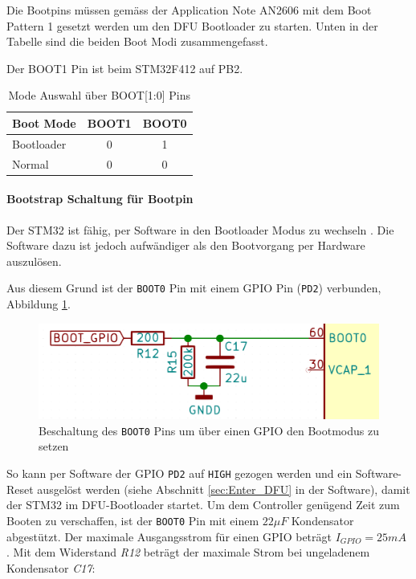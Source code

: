 Die Bootpins müssen gemäss der Application Note AN2606 \cite[Table 2]{AN2606} mit dem Boot Pattern 1 gesetzt werden um den DFU Bootloader zu starten.
Unten in der Tabelle sind die beiden Boot Modi zusammengefasst.

Der BOOT1 Pin ist beim STM32F412 auf PB2.

\begin{table}[H]
\centering
\begin{tabular}{|l|c|c|}
\hline
\textbf{Boot Mode} & \textbf{BOOT1} & \textbf{BOOT0} \\ \hline
Bootloader         & 0              & 1              \\ \hline
Normal             & 0              & 0              \\ \hline
\end{tabular}
\caption{Mode Auswahl über BOOT[1:0] Pins}
\end{table}

\paragraph{Bootstrap Schaltung für Bootpin}

Der STM32 ist fähig, per Software in den Bootloader Modus zu wechseln \cite{STM32-Softreset-Stackoverflow}. Die Software dazu ist jedoch aufwändiger als den Bootvorgang per Hardware auszulösen.

Aus diesem Grund ist der \texttt{BOOT0} Pin mit einem GPIO Pin (\texttt{PD2}) verbunden, Abbildung \ref{fig:Schema_Bootpin_Bootstrap}.

\begin{figure} [H]
	\begin{center}
		\includegraphics[scale=0.5]{../graphics/Schema_Bootpin_Bootstrap}
		\caption{Beschaltung des \texttt{BOOT0} Pins um über einen GPIO den Bootmodus zu setzen}
		\label{fig:Schema_Bootpin_Bootstrap}
	\end{center}
\end{figure}

So kann per Software der GPIO \texttt{PD2} auf \texttt{HIGH} gezogen werden und ein Software-Reset ausgelöst werden (siehe Abschnitt \ref{sec:Enter_DFU} in der Software), damit der STM32 im DFU-Bootloader startet.
Um dem Controller genügend Zeit zum Booten zu verschaffen, ist der \texttt{BOOT0} Pin mit einem $22\si{\mu F}$ Kondensator abgestützt. Der maximale Ausgangsstrom für einen GPIO beträgt $I_{GPIO}=25\si{mA}$ \cite[Table 14]{STM32f412}.
Mit dem Widerstand \textit{R12} beträgt der maximale Strom bei ungeladenem Kondensator \textit{C17}: 

